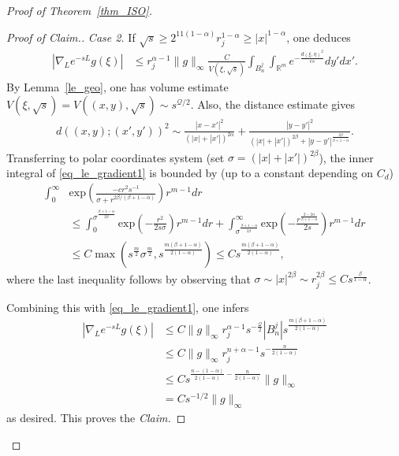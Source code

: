 \documentclass[12pt]{amsart}
\theoremstyle{plain}
\theoremstyle{definition}
\numberwithin{equation}{section}
\begin{document}
\begin{proof}[Proof of Theorem~\ref{thm_ISO}]
\begin{proof}[Proof of \textit{Claim.}]
\textit{Case 2.} If $\sqrt{s}\ge 2^{11(1-\alpha)}r_j^{1-\alpha} \ge |x|^{1-\alpha}$, one deduces
\begin{align}\label{eq_le_gradient1}
\left|\nabla_L e^{-sL}g(\xi)\right| &\le r_j^{\alpha-1} \|g\|_\infty \frac{C}{V(\xi,\sqrt{s})} \int_{B_n^j} \int_{\mathbb{R}^m} e^{-\frac{d(\xi,\eta)^2}{cs}} d y' dx'.
\end{align}
By Lemma~\ref{le_geo}, one has volume estimate $V(\xi,\sqrt{s}) = V((x,y), \sqrt{s}) \sim s^{\mathcal{Q}/2}$. Also, the distance estimate gives
\begin{align*}
    d((x,y);(x',y'))^2 \sim \frac{|x-x'|^2}{\left( |x| + |x'| \right)^{2\alpha}} + \frac{|y-y'|^2}{(|x|+|x'|)^{2\beta} + |y-y'|^{\frac{2\beta}{\beta+1-\alpha}}}.
\end{align*}
Transferring to polar coordinates system (set $\sigma = (|x|+|x'|)^{2\beta}$), the inner integral of \eqref{eq_le_gradient1} is bounded by (up to a constant depending on $C_d$)
\begin{align*}
\int_0^\infty &\textrm{exp}\left(\frac{-cr^2 s^{-1}}{\sigma + r^{2\beta/(\beta+1-\alpha)} } \right) r^{m-1} dr \\
&\le \int_0^{\sigma^{\frac{\beta+1-\alpha}{2\beta}}} \textrm{exp}\left( - \frac{r^2}{2s\sigma} \right) r^{m-1} dr + \int_{\sigma^{\frac{\beta+1-\alpha}{2\beta}}}^\infty \textrm{exp}\left( -\frac{r^{\frac{2-2\alpha}{\beta+1-\alpha}}}{2s} \right) r^{m-1} dr\\
&\le C\max \left(s^{\frac{m}{2}} \sigma^{\frac{m}{2}}, s^{\frac{m(\beta+1-\alpha)}{2(1-\alpha)}} \right) \le C s^{\frac{m(\beta+1-\alpha)}{2(1-\alpha)}},
\end{align*}
where the last inequality follows by observing that $\sigma \sim |x|^{2\beta} \sim r_j^{2\beta} \le C s^{\frac{\beta}{1-\alpha}}$. 

Combining this with \eqref{eq_le_gradient1}, one infers
\begin{align*}
\left|\nabla_L e^{-sL}g(\xi)\right| &\le C\|g\|_\infty r_j^{\alpha-1} s^{-\frac{\mathcal{Q}}{2}} |B_n^j| s^{\frac{m(\beta+1-\alpha)}{2(1-\alpha)}}\\
&\le C \|g\|_\infty r_j^{n+\alpha-1} s^{-\frac{n}{2(1-\alpha)}}\\
&\le Cs^{\frac{n-(1-\alpha)}{2(1-\alpha)} - \frac{n}{2(1-\alpha)}}  \|g\|_\infty  \\
&= C s^{-1/2}\|g\|_\infty
\end{align*}
as desired. This proves the \textit{Claim.}
\end{proof}


\end{proof}
\end{document}

